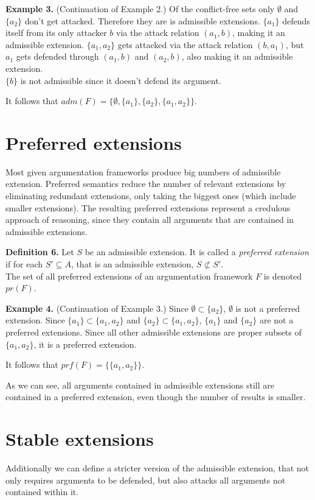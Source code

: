 \documentclass[draft,final]{vutinfth} %
\newcommand{\hl}{\par\vspace{6pt}} %
\newcommand{\cl}{\par\vspace{12pt}} %
\begin{document}
\textbf{Example 3.} (Continuation of Example 2.) Of the conflict-free sets only \(\emptyset\) and $\{a_2\}$ don't get attacked. Therefore they are is admissible extensions. $\{a_1\}$ defends itself from its only attacker $b$ via the attack relation $(a_1,b)$, making it an admissible extension. $\{a_1,a_2\}$ gets attacked via the attack relation $(b,a_1)$, but $a_1$ gets defended through $(a_1,b)$ and $(a_2,b)$, also making it an admissible extension.\\
$\{b\}$ is not admissible since it doesn't defend its argument.\hl
It follows that $adm(F)=\{\emptyset,\{a_1\},\{a_2\},\{a_1,a_2\}\}$.\cl

\section{Preferred extensions}

Most given argumentation frameworks produce big numbers of admissible extension. Preferred semantics reduce the number of relevant extensions by eliminating redundant extensions, only taking the biggest ones (which include smaller extensions). The resulting preferred extensions represent a credulous approach of reasoning, since they contain all arguments that are contained in admissible extensions.\cl %

\textbf{Definition 6.} Let $S$ be an admissible extension. It is called a \emph{preferred extension} if for each $S'\subseteq A$, that is an admissible extension, $S\not\subset S'$.\\
The set of all preferred extensions of an argumentation framework $F$ is denoted $pr(F)$.\cl

\textbf{Example 4.} (Continuation of Example 3.) Since $\emptyset\subset\{a_2\}$, \(\emptyset\) is not a preferred extension. Since $\{a_1\}\subset\{a_1,a_2\}$ and $\{a_2\}\subset\{a_1,a_2\}$, $\{a_1\}$ and $\{a_2\}$ are not a preferred extensions. Since all other admissible extensions are proper subsets of $\{a_1,a_2\}$, it is a preferred extension.\hl
It follows that $prf(F)=\{\{a_1,a_2\}\}$.\hl
As we can see, all arguments contained in admissible extensions still are contained in a preferred extension, even though the number of results is smaller.\cl

\section{Stable extensions}

Additionally we can define a stricter version of the admissible extension, that not only requires arguments to be defended, but also attacks all arguments not contained within it.\cl
\end{document}
